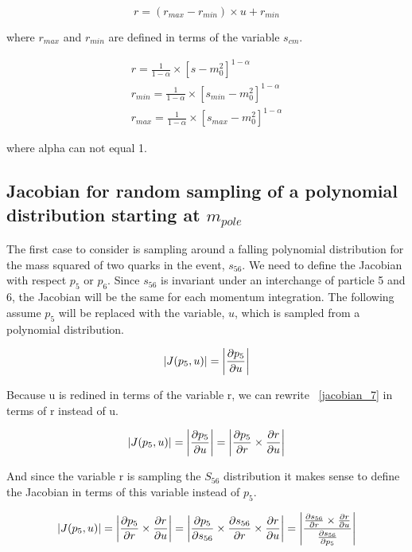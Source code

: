 \begin{equation}
\label{rtou_power}
r = (r_{max} - r_{min}) \times u + r_{min}
\end{equation}

where $r_{max}$ and $r_{min}$ are defined in terms of the variable $s_{cm}$.

\begin{eqnarray}
\label{definer_power}
r = \frac{1}{1-\alpha} \times \left[ s - m_{0}^{2} \right]^{1-\alpha} \\
r_{min} = \frac{1}{1-\alpha} \times \left[ s_{min} - m_{0}^{2}
\right]^{1-\alpha} \\
r_{max} = \frac{1}{1-\alpha} \times \left[ s_{max} - m_{0}^{2}
\right]^{1-\alpha}
\end{eqnarray}

where alpha can not equal 1.


\subsection{Jacobian for random sampling of a polynomial distribution
starting at $m_{pole}$}

The first case to consider is sampling around a falling polynomial distribution
for the mass squared of two quarks in the event, $s_{56}$. We need to define the
Jacobian with respect $p_{5}$ or $p_{6}$. Since $s_{56}$ is invariant under an
interchange of particle 5 and 6, the Jacobian will be the same for each momentum
integration. The following assume $p_{5}$ will be replaced with the variable,
$u$, which is sampled from a polynomial distribution.

\begin{equation}
\label{jacobian_7}
|J(p_{5}, u)| = \left| \frac{\partial p_{5}}{\partial u} \right| 
\end{equation}

Because u is redined in terms of the variable r, we can rewrite ~\ref{jacobian_7}
in terms of r instead of u.

\begin{equation}
\label{jacobian_8}
|J(p_{5}, u)| = \left| \frac{\partial p_{5}}{\partial u} \right| = \left| \frac{\partial p_{5}}{\partial r}
\times \frac{\partial r}{\partial u} \right|
\end{equation}

And since the variable r is sampling the $S_{56}$ distribution it makes sense to
define the Jacobian in terms of this variable instead of $p_{5}$.

\begin{equation}
\label{jacobian_9}
|J(p_{5}, u)| = \left| \frac{\partial p_{5}}{\partial r} \times \frac{\partial r}{\partial u} \right| = \left|
\frac{\partial p_{5}}{\partial s_{56}} \times \frac{\partial s_{56}}{\partial r} \times \frac{\partial r}{\partial u} \right| =
\left | \frac{\frac{\partial s_{56}}{\partial r} \times
\frac{\partial r}{\partial u}}{\frac{\partial s_{56}}{\partial p_{5}}} \right |
\end{equation}

